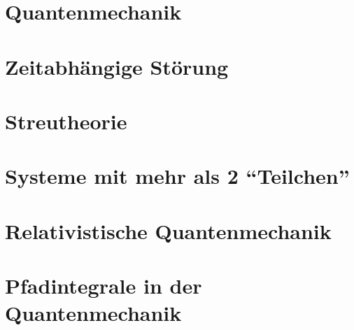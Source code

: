 \documentclass[ngerman, paper=a4, 12pt]{scrartcl}
\begin{document}
\tableofcontents
\newpage
\setcounter{section}{-1}
	
	\section{Quantenmechanik}
	
	
	
	
	\section{Zeitabhängige Störung}
	
	
	
	
	
	
	
	\section{Streutheorie}
	 
	
	
	\section{Systeme mit mehr als 2 ``Teilchen''}
	
	
	 
	
	
	\section{Relativistische Quantenmechanik}
	
	
	
	\section{Pfadintegrale in der Quantenmechanik}
	
	
	
	
	
	
	
	
	
	
	
\end{document}
